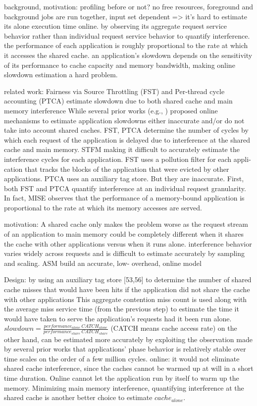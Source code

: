 \documentclass[UTF8]{article}
\begin{document}
background, motivation: profiling before or not?  no free resources, foreground and background jobs are run together, input set dependent => it's hard to estimate its alone execution time online.   by observing its aggregate request service behavior rather than individual request service behavior to quantify interference.  the performance of each application is roughly proportional to the rate at which it accesses the shared cache.   an application’s slowdown depends on the sensitivity of its performance to cache capacity and memory bandwidth, making online slowdown estimation a hard problem.  

related work: Fairness via Source Throttling (FST) \cite{ebrahimi2010fairness}  and Per-thread cycle accounting (PTCA) \cite{du2013per} estimate slowdown due to both shared cache and main memory interference While several prior works (e.g., \cite{ebrahimi2010fairness,du2013per, mutlu2007stall,subramanian2013mise}) proposed online mechanisms to estimate application slowdowns either inaccurate and/or do not take into account shared caches. FST, PTCA determine the number of cycles by which each request of the application is delayed due to interference at the shared cache and main memory.   STFM \cite{mutlu2007stall} making it difficult to accurately estimate the interference cycles for each application. FST uses a pollution filter for each appli- cation that tracks the blocks of the application that were evicted by other applications. PTCA uses an auxiliary tag store. But they are inaccurate. First, both FST and PTCA quantify interference at an individual request granularity.  In fact, MISE \cite{subramanian2013mise} observes that the performance of a memory-bound application is proportional to the rate at which its memory accesses are served.

motivation: A shared cache only makes the problem worse as the request stream of an application to main memory could be completely different when it shares the cache with other applications versus when it runs alone.  interference behavior varies widely across requests and is difficult to estimate accurately by sampling and scaling. ASM build an accurate, low- overhead, online model

Design: by using an auxiliary tag store [53,56] to determine the number of shared cache misses that would have been hits if the application did not share the cache with other applications This aggregate contention miss count is used along with the average miss service time (from the previous step) to estimate the time it would have taken to serve the application’s requests had it been run alone.   $slowdown = \frac{performance_{alone} ~ CATCH_{alone}}{performance_{share} ~ CATCH_{share}}$ (CATCH means cache access rate) on the other hand, can be estimated more accurately by exploiting the observation made by several prior works that applications’ phase behavior is relatively stable over time scales on the order of a few million cycles.   online: it would not eliminate shared cache interference, since the caches cannot be warmed up at will in a short time duration.  Online cannot let the application run by itself to warm up the memory. Minimizing main memory interference, quantifying interference at the shared cache is another better choice to estimate $cache_{alone}$. 
\end{document}
